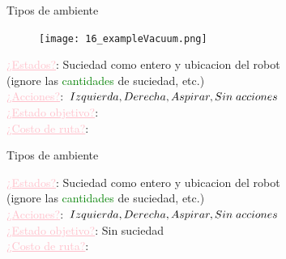 \documentclass{beamer}
\theoremstyle{definition}
\theoremstyle{theorem}
\theoremstyle{remark}
\begin{document}
\begin{frame}{Tipos de ambiente}
    \begin{figure}\texttt{[image: 16\_exampleVacuum.png]}\end{figure}
    \small{
        \textcolor{Pink}{\underline{¿Estados?}}: Suciedad como entero y ubicacion del robot \\          \hspace{1.8cm} (ignore las \textcolor{Green}{cantidades} de suciedad, etc.) \\
        \textcolor{Pink}{\underline{¿Acciones?}}: \textcolor{Purple}{$Izquierda, Derecha, Aspirar, %
        Sin \hspace{0.1cm}acciones$} \\
        \textcolor{Pink}{\underline{¿Estado objetivo?}}: \\
        \textcolor{Pink}{\underline{¿Costo de ruta?}}: 
    }
    \break\break\break\break\break
\end{frame}


\begin{frame}{Tipos de ambiente}
    \small{
        \textcolor{Pink}{\underline{¿Estados?}}: Suciedad como entero y ubicacion del robot \\          \hspace{1.8cm} (ignore las \textcolor{Green}{cantidades} de suciedad, etc.) \\
        \textcolor{Pink}{\underline{¿Acciones?}}: \textcolor{Purple}{$Izquierda, Derecha, Aspirar, %
        Sin \hspace{0.1cm}acciones$} \\
        \textcolor{Pink}{\underline{¿Estado objetivo?}}: Sin suciedad \\
        \textcolor{Pink}{\underline{¿Costo de ruta?}}: 
    }
    \break\break\break\break\break
\end{frame}
\end{document}
